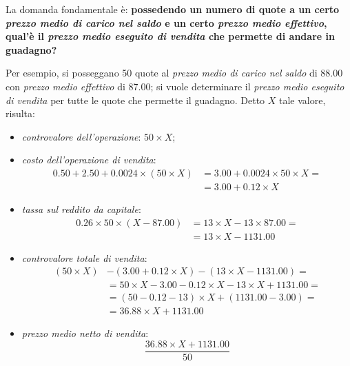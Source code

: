 \documentclass[12pt,a4paper]{article}
\newcommand{\Eur}[1]{\SI{#1}{\text{\euro{}}}}
\begin{document}

La  domanda  fondamentale  è:  \textbf{possedendo  un numero  di  quote  a  un  certo
   \emph{prezzo medio di carico nel saldo}  e un certo \emph{prezzo medio effettivo},
   qual'è  il \emph{prezzo  medio  eseguito di  vendita} che  permette  di andare  in
   guadagno?}

Per esempio, si posseggano \num{50} quote  al \emph{prezzo medio di carico nel saldo}
di  \Eur{88,00}  con  \emph{  prezzo   medio  effettivo}  di  \Eur{87,00};  si  vuole
determinare  il \emph{prezzo  medio  eseguito  di vendita}  per  tutte  le quote  che
permette il guadagno.  Detto \(X\) tale valore, risulta:
\begin{itemize}
\item \emph{controvalore dell'operazione}: \(\num{50} \times{} X\);
\item \emph{costo dell'operazione di vendita}:
  \begin{align*}
    \num{0,50} + \num{2,50} + \num{0,0024} \times{} (\num{50} \times{} X)
    &= \num{3,00} + \num{0,0024} \times{} \num{50} \times{} X = \\
    &= \num{3,00} + \num{0,12} \times{} X
  \end{align*}
\item \emph{tassa sul reddito da capitale}:
  \begin{align*}
    \num{0,26} \times{} \num{50} \times{} (X - \num{87,00})
    &= \num{13} \times{} X - \num{13} \times{} \num{87,00} = \\
    &= \num{13} \times{} X - \num{1131,00}
  \end{align*}
\item \emph{controvalore totale di vendita}:
  \begin{align*}
    (\num{50} \times{} X)
    &- (\num{3,00} + \num{0,12} \times{} X)
      - (\num{13} \times{} X - \num{1131,00})
      = \\
    &= \num{50} \times{} X
      - \num{3,00} - \num{0,12} \times{} X
      - \num{13} \times{} X + \num{1131,00}
      = \\
    &= (\num{50} - \num{0,12} - \num{13}) \times{} X + (\num{1131,00} - \num{3,00})
      = \\
    &= \num{36,88} \times{} X + \num{1131,00}
  \end{align*}
\item \emph{prezzo medio netto di vendita}:
  \begin{equation*}
    \frac{\num{36,88} \times{} X + \num{1131,00}}{50}
  \end{equation*}
\end{itemize}
\end{document}
